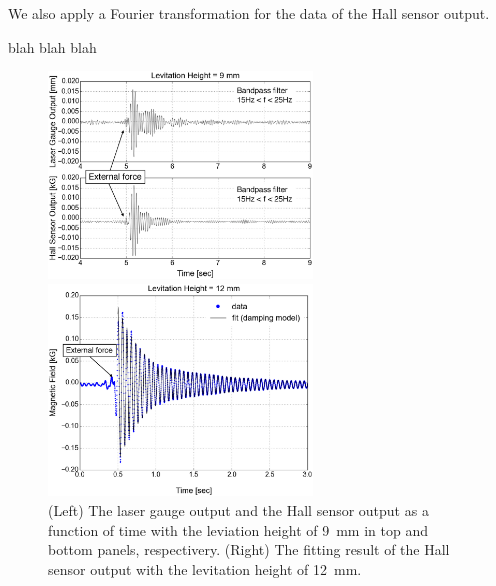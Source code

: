 \documentclass[a4paper]{jpconf}
\begin{document}
We also apply a Fourier transformation for the data of the Hall sensor output.


blah blah blah


\begin{figure}[htbp]
  \centering
  \begin{minipage}{0.45\hsize}
  \includegraphics[width=70mm]{vibration_up.eps}
  \end{minipage}
  \begin{minipage}{0.45\hsize}
    \centering
    \includegraphics[width=70mm]{vibration_fit.eps}
  \end{minipage}
  \caption{(Left) The laser gauge output and the Hall sensor output as a function of time with the leviation height of 9~mm in top and bottom panels, respectivery.
    (Right) The fitting result of the Hall sensor output with the levitation height of 12~mm.}
  \label{vibration}
\end{figure}
\end{document}
